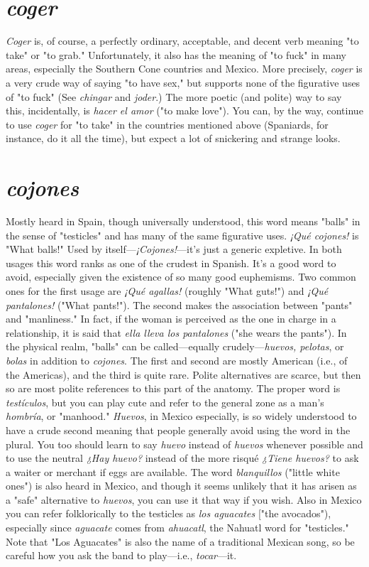 \section{\emph{coger}}

\emph{Coger} is, of course, a perfectly ordinary, acceptable, and decent
verb meaning "to take" or "to grab." Unfortunately, it also has the
meaning of "to fuck" in many areas, especially the Southern Cone
countries and Mexico. More precisely, \emph{coger} is a very crude way of saying "to have sex," but supports none of the figurative uses of "to fuck"
(See \emph{chingar} and \emph{joder}.) The more poetic (and polite) way to say this,
incidentally, is \emph{hacer el amor} ("to make love"). You can, by the way,
continue to use \emph{coger} for "to take" in the countries mentioned above
(Spaniards, for instance, do it all the time), but expect a lot of snickering and strange looks.

\section{\emph{cojones}}

Mostly heard in Spain, though universally understood, this
word means "balls" in the sense of "testicles" and has many of the
same figurative uses. \emph{¡Qué cojones!} is "What balls!" Used by itself---\emph{¡Cojones!}---it's just a generic expletive. In both usages this word ranks
as one of the crudest in Spanish. It's a good word to avoid, especially
given the existence of so many good euphemisms. Two common ones
for the first usage are \emph{¡Qué agallas!} (roughly "What guts!") and \emph{¡Qué
pantalones!} ("What pants!"). The second makes the association between "pants" and "manliness." In fact, if the woman is perceived as
the one in charge in a relationship, it is said that \emph{ella lleva los pantalones} ("she wears the pants").
In the physical realm, "balls" can be called---equally
crudely---\emph{huevos, pelotas}, or \emph{bolas} in addition to \emph{cojones}. The first
and second are mostly American (i.e., of the Americas), and the third is
quite rare. Polite alternatives are scarce, but then so are most polite
references to this part of the anatomy. The proper word is \emph{testículos},
but you can play cute and refer to the general zone as a man's \emph{hombría},
or "manhood."
\emph{Huevos}, in Mexico especially, is so widely understood to have
a crude second meaning that people generally avoid using the word in
the plural. You too should learn to say \emph{huevo} instead of \emph{huevos} whenever possible and to use the neutral \emph{¿Hay huevo?} instead of the more
risqué \emph{¿Tiene huevos?} to ask a waiter or merchant if eggs are available.
The word \emph{blanquillos} ("little white ones") is also heard in Mexico, and
though it seems unlikely that it has arisen as a "safe" alternative to
\emph{huevos}, you can use it that way if you wish. Also in Mexico you can
refer folklorically to the testicles as \emph{los aguacates} ["the avocados"),
especially since \emph{aguacate} comes from \emph{ahuacatl}, the Nahuatl word
for "testicles." Note that "Los Aguacates" is also the name of a traditional Mexican song, so be careful how you ask the band to play---i.e.,
\emph{tocar}---it.

